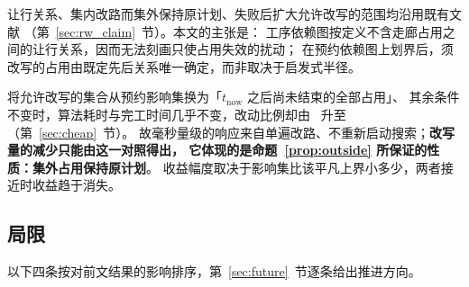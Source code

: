 让行关系、集内改路而集外保持原计划、失败后扩大允许改写的范围均沿用既有文献
（第~\ref{sec:rw_claim}~节）。本文的主张是：
工序依赖图按定义不含走廊占用之间的让行关系，因而无法刻画只使占用失效的扰动；
在预约依赖图上划界后，须改写的占用由既定先后关系唯一确定，而非取决于启发式半径。

将允许改写的集合从预约影响集换为「\(t_{\mathrm{now}}\) 之后尚未结束的全部占用」、
其余条件不变时，算法耗时与完工时间几乎不变，改动比例却由 \ResFracCheapRtwo\ 升至
\ResFracAllFuture（第~\ref{sec:cheap}~节）。
故毫秒量级的响应来自单遍改路、不重新启动搜索；\textbf{改写量的减少只能由这一对照得出，
它体现的是命题~\ref{prop:outside} 所保证的性质：集外占用保持原计划}。
收益幅度取决于影响集比该平凡上界小多少，两者接近时收益趋于消失。

\subsection{局限}
\label{sec:limitations}

以下四条按对前文结果的影响排序，第~\ref{sec:future}~节逐条给出推进方向。

